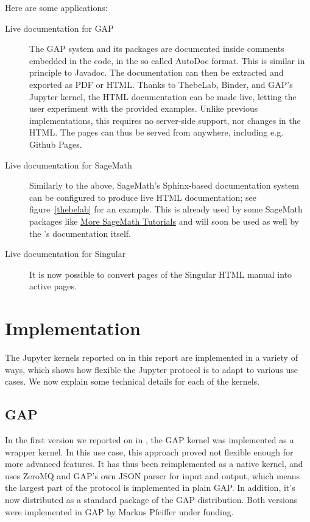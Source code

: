\documentclass{deliverablereport}
\begin{document}
Here are some applications:
\begin{description}
\item[Live documentation for GAP] The GAP system and its packages are documented
inside comments embedded in the code, in the so called AutoDoc format.
This is similar in principle to Javadoc.
The documentation can then be extracted and exported as PDF or HTML.
Thanks to ThebeLab, Binder, and GAP's Jupyter kernel, the HTML documentation can be made live,
letting the user experiment with the provided examples.
Unlike previous implementations, this requires no server-side support, nor changes in the HTML.
The pages can thus be served from anywhere, including e.g. Github Pages.

\item[Live documentation for SageMath] Similarly to the above, SageMath's Sphinx-based documentation system
  can be configured to produce live HTML documentation;
  see figure~\ref{thebelab} for an example.
This is already used by some SageMath packages like
\href{http://more-sagemath-tutorials.readthedocs.io/}{More SageMath Tutorials}
and will soon be used as well by the \Sage's documentation itself.

\item[Live documentation for Singular] It is now possible to convert pages of the Singular
HTML manual into active pages.

\end{description}


\section{Implementation}

The Jupyter kernels reported on in this report are implemented in a variety of ways, which shows how flexible
the Jupyter protocol is to adapt to various use cases. We now explain some technical details for each of the kernels.

\subsection{GAP}

In the first version we reported on in
, the GAP kernel was implemented as
a wrapper kernel. In this use case, this approach proved not flexible
enough for more advanced features. It has thus been reimplemented as a
native kernel, and uses ZeroMQ and GAP's own JSON parser for input and
output, which means the largest part of the protocol is implemented in
plain GAP. In addition, it's now distributed as a standard package of
the GAP distribution. Both versions were implemented in GAP by Markus
Pfeiffer under \ODK funding.
\end{document}
